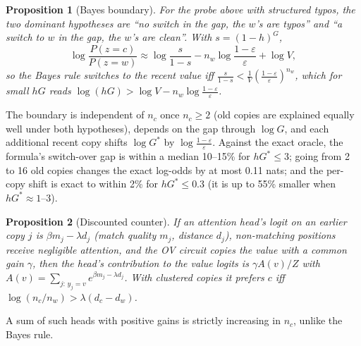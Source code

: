 \documentclass[11pt]{article}
\newtheorem{proposition}{Proposition}
\begin{document}
\begin{proposition}[Bayes boundary]\label{prop:bayes}
For the probe above with structured typos, the two dominant hypotheses are ``no switch in the gap, the $w$'s are typos'' and ``a switch to $w$ in the gap, the $w$'s are clean''. With $s = (1-h)^G$,
\[
\log\frac{P(z=c)}{P(z=w)} \approx \log\frac{s}{1-s} - n_w\log\frac{1-\varepsilon}{\varepsilon} + \log V,
\]
so the Bayes rule switches to the recent value iff $\frac{s}{1-s} < \frac{1}{V}\left(\frac{1-\varepsilon}{\varepsilon}\right)^{n_w}$, which for small $hG$ reads
$\log(hG) > \log V - n_w \log\frac{1-\varepsilon}{\varepsilon}$.
\end{proposition}

The boundary is independent of $n_c$ once $n_c \ge 2$ (old copies are explained equally well under both hypotheses), depends on the gap through $\log G$, and each additional recent copy shifts $\log G^*$ by $\log\frac{1-\varepsilon}{\varepsilon}$. Against the exact oracle, the formula's switch-over gap is within a median 10--15\% for $hG^* \le 3$; going from 2 to 16 old copies changes the exact log-odds by at most 0.11 nats; and the per-copy shift is exact to within 2\% for $hG^* \le 0.3$ (it is up to 55\% smaller when $hG^* \approx 1$--3).

\begin{proposition}[Discounted counter]\label{prop:counter}
If an attention head's logit on an earlier copy $j$ is $\beta m_j - \lambda d_j$ (match quality $m_j$, distance $d_j$), non-matching positions receive negligible attention, and the OV circuit copies the value with a common gain $\gamma$, then the head's contribution to the value logits is $\gamma A(v)/Z$ with $A(v) = \sum_{j:\, y_j = v} e^{\beta m_j - \lambda d_j}$. With clustered copies it prefers $c$ iff $\log(n_c/n_w) > \lambda(d_c - d_w)$.
\end{proposition}

\noindent A sum of such heads with positive gains is strictly increasing in $n_c$, unlike the Bayes rule.
\end{document}
